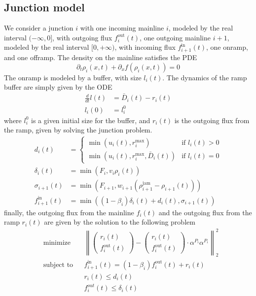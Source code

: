 
\subsection{Junction model}\label{sub:junction-model}
We consider a junction $i$ with one incoming mainline $i$, modeled by the real interval $(-\infty, 0]$, with outgoing flux $f_i^{\text{out}}(t)$, one outgoing mainline $i+1$, modeled by the real interval $[0, +\infty)$, with incoming flux $f^{\text{in}}_{i+1}(t)$, one onramp, and one offramp. The density on the mainline satisfies the PDE
\[
\partial_t \rho_i(x, t) + \partial_x f(\rho_i(x, t)) = 0
\]
The onramp is modeled by a buffer, with size $l_i(t)$. The dynamics of the ramp buffer are simply given by the ODE
\begin{align}
\frac{d}{dt} l(t) &= \bar{D}_i(t) - r_i(t) \\
l_i(0) &= l_i^0
\end{align}
where $l_i^0$ is a given initial size for the buffer, and $r_i(t)$ is the outgoing flux from the ramp, given by solving the junction problem.
\begin{align*}
d_i(t) &= \begin{cases}
\min (u_i(t), r_i^{\max}) & \text{if } l_i(t) > 0 \\
\min (u_i(t), r_i^{\max}, \bar{D}_i(t)) & \text{if } l_i(t) = 0
\end{cases} \\
\delta_i(t) &= \min\left(F_i, v_i \rho_i(t) \right) \\
\sigma_{i+1}(t) &= \min \left( F_{i+1}, w_{i+1} \left( \rho_{i+1}^{\text{jam}} - \rho_{i+1}(t) \right) \right) \\
f_{i+1}^{\text{in}}(t) &= \min \left( (1-\beta_i)\delta_i(t) + d_i(t), \sigma_{i+1}(t)\right)
\end{align*}
finally, the outgoing flux from the mainline $f_i(t)$ and the outgoing flux from the ramp $r_i(t)$ are given by the solution to the following problem
\begin{equation}
\begin{aligned}
& \text{minimize} && \left\| \left(\begin{array}{c} r_i(t) \\ f_i^{\text{out}}(t) \end{array} \right) - \left(\begin{array}{c} r_i(t) \\ f_i^{\text{out}}(t) \end{array} \right) \cdot \alpha^{P_i} \alpha^{P_i} \right\|_2^2\\
& \text{subject to} && f_{i+1}^{\text{in}}(t) = (1-\beta_i)f_i^{\text{out}}(t) + r_i(t) \\
&&& r_i(t) \leq d_i(t) \\
&&& f_i^{out}(t) \leq \delta_i(t) \\
\end{aligned}
\end{equation}
